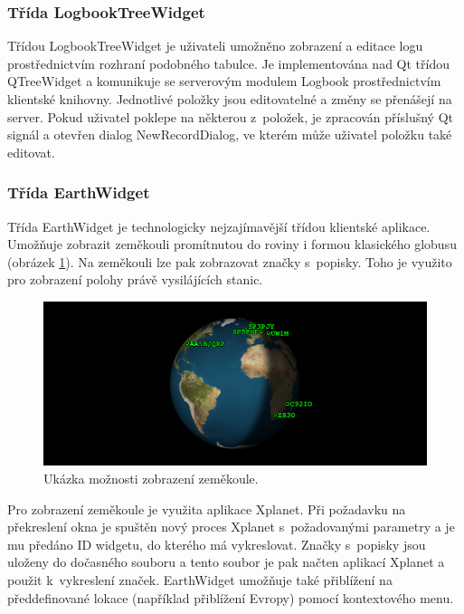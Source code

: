 \subsubsection{Třída LogbookTreeWidget}

Třídou LogbookTreeWidget je uživateli umožněno zobrazení a editace logu prostřednictvím rozhraní podobného tabulce.
Je implementována nad Qt třídou QTreeWidget a komunikuje 
se serverovým modulem Logbook prostřednictvím klientské knihovny. Jednotlivé položky jsou editovatelné a změny se přenášejí
na server. Pokud uživatel poklepe na některou z~položek, je zpracován příslušný Qt signál a otevřen dialog NewRecordDialog,
ve kterém může uživatel položku také editovat.

\subsubsection{Třída EarthWidget}

Třída EarthWidget je technologicky nejzajímavější třídou klientské aplikace. Umožňuje zobrazit zeměkouli promítnutou do roviny i 
formou klasického globusu (obrázek \ref{fig:globus}). Na zeměkouli lze pak zobrazovat značky s~popisky. Toho je využito pro zobrazení polohy právě vysilájících
stanic.

\begin{figure}[h]
\centering
\includegraphics[trim=0cm 0cm 0cm 0cm, scale=0.9]{fig/ham5}
\caption{Ukázka možnosti zobrazení zeměkoule.}
\label{fig:globus}
\end{figure}

Pro zobrazení zeměkoule je využita aplikace Xplanet. Při požadavku na překreslení okna je spuštěn nový proces Xplanet
s~požadovanými parametry a je mu předáno ID widgetu, do kterého má vykreslovat. Značky s~popisky jsou uloženy do dočasného souboru
a tento soubor je pak načten aplikací Xplanet a použit k~vykreslení značek.
EarthWidget umožňuje také přiblížení na předdefinované lokace (například přiblížení Evropy) pomocí kontextového menu.

